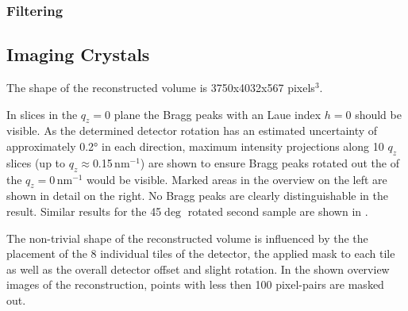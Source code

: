 \subsubsection{Filtering}
\subsection{Imaging Crystals}
The shape of the reconstructed volume is 3750x4032x567 pixels$^3$.

 In slices in the $q_z=0$ plane the Bragg peaks with an Laue index $h=0$ should be visible. As the determined detector rotation has an estimated uncertainty of approximately 0.2° in each direction, maximum intensity projections along 10 $q_z$ slices (up to $q_z\approx$0.15\,nm$^{-1}$) are shown to ensure Bragg peaks rotated out the of the $q_z=0$\,nm$^{-1}$ would be visible. Marked areas in the overview on the left are shown in detail on the right.  No Bragg peaks are clearly distinguishable in the result.
 Similar results for the 45$\deg$ rotated second sample are shown in .
 
 The non-trivial shape of the reconstructed volume is influenced by the the placement of the 8 individual tiles of the detector, the applied mask to each tile as well as the overall detector offset and slight rotation. In the shown overview images of the reconstruction, points with less then 100 pixel-pairs are masked out.
 
